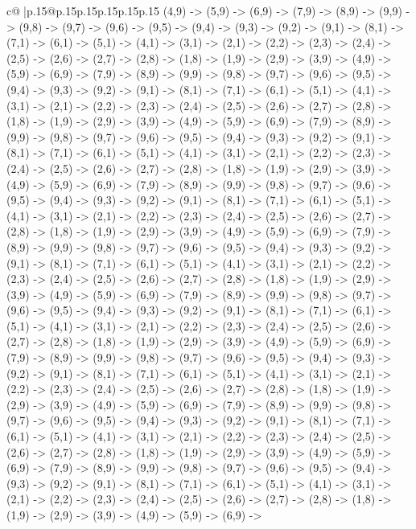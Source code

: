 \documentclass{article}
\begin{document}
{\begin{supertabular}{c@{$\;$}|p{.15\linewidth}@{}p{.15\linewidth}p{.15\linewidth}p{.15\linewidth}p{.15\linewidth}p{.15\linewidth}}
{{{(4,9) {-}> (5,9) {-}> (6,9) {-}> (7,9) {-}> (8,9) {-}> (9,9) {-}> (9,8) {-}> (9,7) {-}> (9,6) {-}> (9,5) {-}> (9,4) {-}> (9,3) {-}> (9,2) {-}> (9,1) {-}> (8,1) {-}> (7,1) {-}> (6,1) {-}> (5,1) {-}> (4,1) {-}> (3,1) {-}> (2,1) {-}> (2,2) {-}> (2,3) {-}> (2,4) {-}> (2,5) {-}> (2,6) {-}> (2,7) {-}> (2,8) {-}> (1,8) {-}> (1,9) {-}> (2,9) {-}> (3,9) {-}> (4,9) {-}> (5,9) {-}> (6,9) {-}> (7,9) {-}> (8,9) {-}> (9,9) {-}> (9,8) {-}> (9,7) {-}> (9,6) {-}> (9,5) {-}> (9,4) {-}> (9,3) {-}> (9,2) {-}> (9,1) {-}> (8,1) {-}> (7,1) {-}> (6,1) {-}> (5,1) {-}> (4,1) {-}> (3,1) {-}> (2,1) {-}> (2,2) {-}> (2,3) {-}> (2,4) {-}> (2,5) {-}> (2,6) {-}> (2,7) {-}> (2,8) {-}> (1,8) {-}> (1,9) {-}> (2,9) {-}> (3,9) {-}> (4,9) {-}> (5,9) {-}> (6,9) {-}> (7,9) {-}> (8,9) {-}> (9,9) {-}> (9,8) {-}> (9,7) {-}> (9,6) {-}> (9,5) {-}> (9,4) {-}> (9,3) {-}> (9,2) {-}> (9,1) {-}> (8,1) {-}> (7,1) {-}> (6,1) {-}> (5,1) {-}> (4,1) {-}> (3,1) {-}> (2,1) {-}> (2,2) {-}> (2,3) {-}> (2,4) {-}> (2,5) {-}> (2,6) {-}> (2,7) {-}> (2,8) {-}> (1,8) {-}> (1,9) {-}> (2,9) {-}> (3,9) {-}> (4,9) {-}> (5,9) {-}> (6,9) {-}> (7,9) {-}> (8,9) {-}> (9,9) {-}> (9,8) {-}> (9,7) {-}> (9,6) {-}> (9,5) {-}> (9,4) {-}> (9,3) {-}> (9,2) {-}> (9,1) {-}> (8,1) {-}> (7,1) {-}> (6,1) {-}> (5,1) {-}> (4,1) {-}> (3,1) {-}> (2,1) {-}> (2,2) {-}> (2,3) {-}> (2,4) {-}> (2,5) {-}> (2,6) {-}> (2,7) {-}> (2,8) {-}> (1,8) {-}> (1,9) {-}> (2,9) {-}> (3,9) {-}> (4,9) {-}> (5,9) {-}> (6,9) {-}> (7,9) {-}> (8,9) {-}> (9,9) {-}> (9,8) {-}> (9,7) {-}> (9,6) {-}> (9,5) {-}> (9,4) {-}> (9,3) {-}> (9,2) {-}> (9,1) {-}> (8,1) {-}> (7,1) {-}> (6,1) {-}> (5,1) {-}> (4,1) {-}> (3,1) {-}> (2,1) {-}> (2,2) {-}> (2,3) {-}> (2,4) {-}> (2,5) {-}> (2,6) {-}> (2,7) {-}> (2,8) {-}> (1,8) {-}> (1,9) {-}> (2,9) {-}> (3,9) {-}> (4,9) {-}> (5,9) {-}> (6,9) {-}> (7,9) {-}> (8,9) {-}> (9,9) {-}> (9,8) {-}> (9,7) {-}> (9,6) {-}> (9,5) {-}> (9,4) {-}> (9,3) {-}> (9,2) {-}> (9,1) {-}> (8,1) {-}> (7,1) {-}> (6,1) {-}> (5,1) {-}> (4,1) {-}> (3,1) {-}> (2,1) {-}> (2,2) {-}> (2,3) {-}> (2,4) {-}> (2,5) {-}> (2,6) {-}> (2,7) {-}> (2,8) {-}> (1,8) {-}> (1,9) {-}> (2,9) {-}> (3,9) {-}> (4,9) {-}> (5,9) {-}> (6,9) {-}> (7,9) {-}> (8,9) {-}> (9,9) {-}> (9,8) {-}> (9,7) {-}> (9,6) {-}> (9,5) {-}> (9,4) {-}> (9,3) {-}> (9,2) {-}> (9,1) {-}> (8,1) {-}> (7,1) {-}> (6,1) {-}> (5,1) {-}> (4,1) {-}> (3,1) {-}> (2,1) {-}> (2,2) {-}> (2,3) {-}> (2,4) {-}> (2,5) {-}> (2,6) {-}> (2,7) {-}> (2,8) {-}> (1,8) {-}> (1,9) {-}> (2,9) {-}> (3,9) {-}> (4,9) {-}> (5,9) {-}> (6,9) {-}> (7,9) {-}> (8,9) {-}> (9,9) {-}> (9,8) {-}> (9,7) {-}> (9,6) {-}> (9,5) {-}> (9,4) {-}> (9,3) {-}> (9,2) {-}> (9,1) {-}> (8,1) {-}> (7,1) {-}> (6,1) {-}> (5,1) {-}> (4,1) {-}> (3,1) {-}> (2,1) {-}> (2,2) {-}> (2,3) {-}> (2,4) {-}> (2,5) {-}> (2,6) {-}> (2,7) {-}> (2,8) {-}> (1,8) {-}> (1,9) {-}> (2,9) {-}> (3,9) {-}> (4,9) {-}> (5,9) {-}> (6,9) {-}> (7,9) {-}> (8,9) {-}> (9,9) {-}> (9,8) {-}> (9,7) {-}> (9,6) {-}> (9,5) {-}> (9,4) {-}> (9,3) {-}> (9,2) {-}> (9,1) {-}> (8,1) {-}> (7,1) {-}> (6,1) {-}> (5,1) {-}> (4,1) {-}> (3,1) {-}> (2,1) {-}> (2,2) {-}> (2,3) {-}> (2,4) {-}> (2,5) {-}> (2,6) {-}> (2,7) {-}> (2,8) {-}> (1,8) {-}> (1,9) {-}> (2,9) {-}> (3,9) {-}> (4,9) {-}> (5,9) {-}> (6,9) {-}> }}}
\end{supertabular}}
\end{document}
